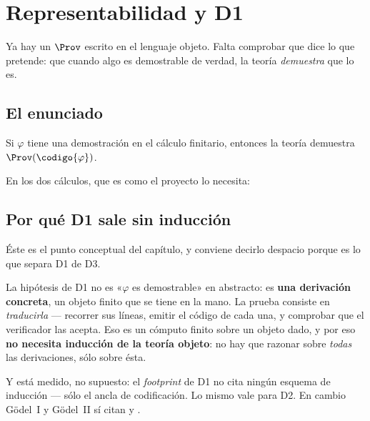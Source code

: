 \chapter{Representabilidad y D1}
\label{cap:d1}

Ya hay un $\Prov$ escrito en el lenguaje objeto. Falta comprobar que dice lo que pretende: que
cuando algo es demostrable de verdad, la teoría \emph{demuestra} que lo es.

\section{El enunciado}

\begin{teorema}
Si $\varphi$ tiene una demostración en el cálculo finitario, entonces la teoría demuestra
$\Prov(\codigo{\varphi})$.
\end{teorema}

\noindent En los dos cálculos, que es como el proyecto lo necesita:



\section{Por qué D1 sale sin inducción}

Éste es el punto conceptual del capítulo, y conviene decirlo despacio porque es lo que separa D1 de
D3.

\begin{leccion}
La hipótesis de D1 no es «$\varphi$ es demostrable» en abstracto: es \textbf{una derivación
concreta}, un objeto finito que se tiene en la mano. La prueba consiste en \emph{traducirla} —
recorrer sus líneas, emitir el código de cada una, y comprobar que el verificador las acepta. Eso es
un cómputo finito sobre un objeto dado, y por eso \textbf{no necesita inducción de la teoría
objeto}: no hay que razonar sobre \emph{todas} las derivaciones, sólo sobre ésta.
\end{leccion}

Y está medido, no supuesto: el \emph{footprint} de D1 no cita ningún esquema de inducción — sólo el
ancla de codificación. Lo mismo vale para D2. En cambio Gödel~I y Gödel~II sí citan
 y .

